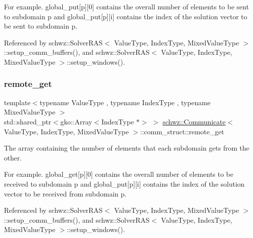 For example. global\+\_\+put\mbox{[}p\mbox{]}\mbox{[}0\mbox{]} contains the overall number of elements to be sent to subdomain p and global\+\_\+put\mbox{[}p\mbox{]}\mbox{[}i\mbox{]} contains the index of the solution vector to be sent to subdomain p. 

Referenced by schwz\+::\+Solver\+R\+A\+S$<$ Value\+Type, Index\+Type, Mixed\+Value\+Type $>$\+::setup\+\_\+comm\+\_\+buffers(), and schwz\+::\+Solver\+R\+A\+S$<$ Value\+Type, Index\+Type, Mixed\+Value\+Type $>$\+::setup\+\_\+windows().

\mbox{\label{structschwz_1_1Communicate_1_1comm__struct_a70f57e5c0ab445089ca9d8bdc0fa3838}} 
\subsubsection{\texorpdfstring{remote\+\_\+get}{remote\_get}}
{\footnotesize\ttfamily template$<$typename Value\+Type , typename Index\+Type , typename Mixed\+Value\+Type $>$ \\
std\+::shared\+\_\+ptr$<$gko\+::\+Array$<$Index\+Type $\ast$$>$ $>$ \hyperlink{classschwz_1_1Communicate}{schwz\+::\+Communicate}$<$ Value\+Type, Index\+Type, Mixed\+Value\+Type $>$\+::comm\+\_\+struct\+::remote\+\_\+get}



The array containing the number of elements that each subdomain gets from the other. 

For example. global\+\_\+get\mbox{[}p\mbox{]}\mbox{[}0\mbox{]} contains the overall number of elements to be received to subdomain p and global\+\_\+put\mbox{[}p\mbox{]}\mbox{[}i\mbox{]} contains the index of the solution vector to be received from subdomain p. 

Referenced by schwz\+::\+Solver\+R\+A\+S$<$ Value\+Type, Index\+Type, Mixed\+Value\+Type $>$\+::setup\+\_\+comm\+\_\+buffers(), and schwz\+::\+Solver\+R\+A\+S$<$ Value\+Type, Index\+Type, Mixed\+Value\+Type $>$\+::setup\+\_\+windows().

\mbox{\label{structschwz_1_1Communicate_1_1comm__struct_a206d13b093699bf04bd1efb51c4290f2}} 
